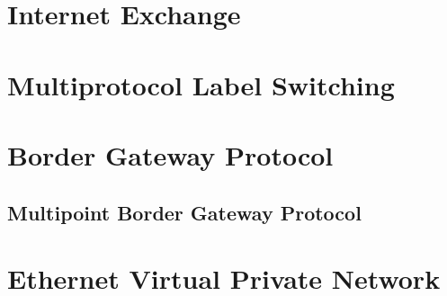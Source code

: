 \section[IXP]{Internet Exchange}

\section[MPLS]{Multiprotocol Label Switching}

\section[BGP]{Border Gateway Protocol}

\subsection[MP-BGP]{Multipoint Border Gateway Protocol}

\section[EVPN]{Ethernet Virtual Private Network}
